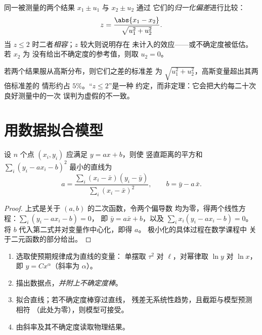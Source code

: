 \begin{definition}[归一化偏差]\label{def:b1:units-dimensions:zscore}
同一被测量的两个结果 $x_1 \pm u_1$ 与 $x_2 \pm u_2$ 通过
它们的\emph{归一化偏差}进行比较：
\[
z = \frac{\abs{x_1 - x_2}}{\sqrt{u_1^2 + u_2^2}} .
\]
当 $z \leq 2$ 时二者\emph{相容}；$z$ 较大则说明存在
未计入的效应——或不确定度被低估。若 $x_2$ 为
没有给出不确定度的参考值，则取 $u_2 = 0$。
\end{definition}

\begin{remark}[为何取 2]\label{rem:b1:units-dimensions:why2}
若两个结果服从高斯分布，则它们之差的标准差
为 $\sqrt{u_1^2 + u_2^2}$，高斯变量超出其两倍标准差的
情形约占 $5\%$。“$z \leq 2$”是一种
约定，而非定理：它会把大约每二十次良好测量中的一次
误判为虚假的不一致。
\end{remark}

\section{用数据拟合模型}

\begin{proposition}[最小二乘直线]\label{prop:b1:units-dimensions:regression}
设 $n$ 个点 $(x_i, y_i)$ 应满足 $y = a x + b$，则使
竖直距离的平方和
$\sum_i (y_i - a x_i - b)^2$ 最小的直线为
\[
a = \frac{\sum_i (x_i - \bar x)(y_i - \bar y)}{\sum_i (x_i - \bar x)^2},
\qquad
b = \bar y - a\,\bar x .
\]
\end{proposition}

\begin{proof}
上式是关于 $(a, b)$ 的二次函数，令两个偏导数
均为零，得两个线性方程：$\sum_i (y_i - ax_i - b) = 0$，
即 $\bar y = a \bar x + b$，以及 $\sum_i x_i (y_i - ax_i - b) = 0$。
将 $b$ 代入第二式并对变量作中心化，即得 $a$。
极小化的具体过程在数学课程中
关于二元函数的部分给出。
\end{proof}

\begin{method}[用图像检验模型]\label{met:b1:units-dimensions:fit}
\begin{enumerate}
  \item 选取使预期规律成为直线的变量：
        单摆取 $\tau^2$ 对 $\ell$，对幂律取 $\ln y$ 对
        $\ln x$，即 $y = Cx^\alpha$（斜率为 $\alpha$）。
  \item 描出数据点，\emph{并附上不确定度棒}。
  \item 拟合直线；若不确定度棒穿过直线，
        残差无系统性趋势，且截距与模型预测相符
        （此处为零），则模型可接受。
  \item 由斜率及其不确定度读取物理结果。
\end{enumerate}
\end{method}

